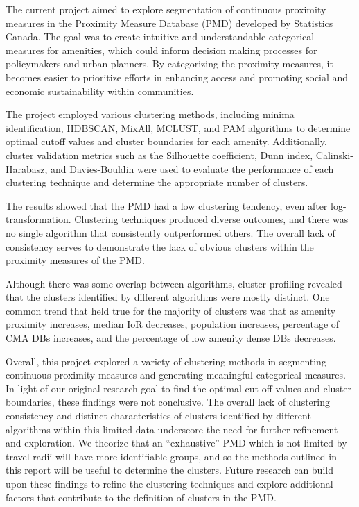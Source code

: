 \documentclass[11pt, a4paper]{article}
\begin{document}
The current project aimed to explore segmentation of continuous proximity measures in the Proximity Measure Database (PMD) developed by Statistics Canada. The goal was to create intuitive and understandable categorical measures for amenities, which could inform decision making processes for policymakers and urban planners. By categorizing the proximity measures, it becomes easier to prioritize efforts in enhancing access and promoting social and economic sustainability within communities.
\par
The project employed various clustering methods, including minima identification, HDBSCAN, MixAll, MCLUST, and PAM algorithms to determine optimal cutoff values and cluster boundaries for each amenity. Additionally, cluster validation metrics such as the Silhouette coefficient, Dunn index, Calinski-Harabasz, and Davies-Bouldin were used to evaluate the performance of each clustering technique and determine the appropriate number of clusters.
\par
The results showed that the PMD had a low clustering tendency, even after log-transformation. Clustering techniques produced diverse outcomes, and there was no single algorithm that consistently outperformed others. The overall lack of consistency serves to demonstrate the lack of obvious clusters within the proximity measures of the PMD.
\par
Although there was some overlap between algorithms, cluster profiling revealed that the clusters identified by different algorithms were mostly distinct. One common trend that held true for the majority of clusters was that as amenity proximity increases, median IoR decreases, population increases, percentage of CMA DBs increases, and the percentage of low amenity dense DBs decreases.
\par
Overall, this project explored a variety of clustering methods in segmenting continuous proximity measures and generating meaningful categorical measures. In light of our original research goal to find the optimal cut-off values and cluster boundaries, these findings were not conclusive. The overall lack of clustering consistency and distinct characteristics of clusters identified by different algorithms within this limited data underscore the need for further refinement and exploration. We theorize that an ``exhaustive'' PMD which is not limited by travel radii will have more identifiable groups, and so the methods outlined in this report will be useful to determine the clusters. Future research can build upon these findings to refine the clustering techniques and explore additional factors that contribute to the definition of clusters in the PMD.
\end{document}
